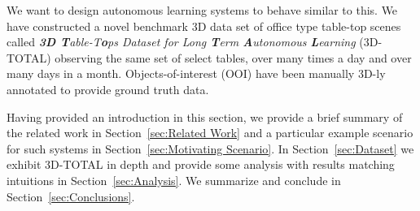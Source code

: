 \documentclass[letterpaper, 10 pt, conference]{ieeeconf}  %
\begin{document}
We want to design autonomous learning systems to behave similar to this. We have constructed a novel benchmark 3D data set of office type table-top scenes called \textit{\textbf{3D T}able-T\textbf{o}ps Dataset for Long \textbf{T}erm \textbf{A}utonomous \textbf{L}earning} (3D-TOTAL) observing the same set of select tables, over many times a day and over many days in a month. Objects-of-interest (OOI) have been manually 3D-ly annotated to provide ground truth data.

Having provided an introduction in this section, we provide a brief summary of the related work in Section~\ref{sec:Related Work} and a particular example scenario for such systems in Section~\ref{sec:Motivating Scenario}. In Section~\ref{sec:Dataset} we exhibit 3D-TOTAL in depth and provide some analysis with results matching intuitions in Section~\ref{sec:Analysis}. We summarize and conclude in Section~\ref{sec:Conclusions}.

\end{document}
